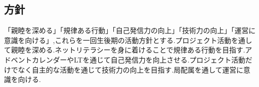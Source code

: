 \subsection*{\firstGrade{}方針}



「親睦を深める」「規律ある行動」「自己発信力の向上」「技術力の向上」「運営に意識を向ける」,これらを一回生後期の活動方針とする.プロジェクト活動を通して親睦を深める.ネットリテラシーを身に着けることで規律ある行動を目指す.アドベントカレンダーやLTを通じて自己発信力を向上させる.プロジェクト活動だけでなく自主的な活動を通じて技術力の向上を目指す.局配属を通して運営に意識を向ける.
